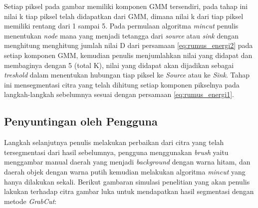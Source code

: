 Setiap piksel pada gambar memiliki komponen GMM tersendiri, pada tahap ini nilai k
tiap piksel telah didapatkan dari GMM, dimana nilai k dari tiap piksel memiliki rentang
dari 1 sampai 5. Pada permulaan algoritma \emph{mincut} penulis menentukan \emph{node}
mana yang menjadi tetangga dari \emph{source} atau \emph{sink} dengan menghitung
menghitung jumlah nilai D dari persamaan \ref{eq:rumus_energi2} pada setiap komponen GMM, 
kemudian penulis menjumlahkan nilai yang didapat dan membaginya dengan 5 (total K),
nilai yang didapat akan dijadikan sebagai \emph{treshold} dalam menentukan hubungan
tiap piksel ke \emph{Source} atau ke \emph{Sink}. Tahap ini mensegmentasi citra 
yang telah dihitung setiap komponen pikselnya pada langkah-langkah sebelumnya sesuai 
dengan persamaan \ref{eq:rumus_energi1}.




	



\subsection{Penyuntingan oleh Pengguna}
Langkah selanjutnya penulis melakukan perbaikan dari citra yang telah tersegmentasi
dari hasil sebelumnya, pengguna menggunakan \emph{brush} yaitu menggambar manual daerah 
yang menjadi \emph{background} dengan warna hitam, dan daerah objek dengan warna putih
kemudian melakukan algoritma \emph{mincut} yang hanya dilakukan sekali. Berikut 
gambaran simulasi penelitian yang akan penulis lakukan terhadap citra gambar luka 
untuk mendapatkan hasil segmentasi dengan metode \emph{GrabCut}:

